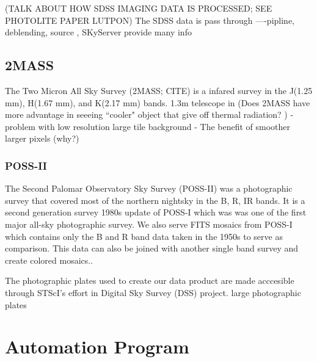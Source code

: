 \documentclass[5p]{elsarticle}
\begin{document}
(TALK ABOUT HOW SDSS IMAGING DATA IS PROCESSED; SEE PHOTOLITE PAPER LUTPON) 	 The SDSS data is pass through ----pipline, deblending, source , 
	SKyServer provide many info
	

	\subsection{2MASS}
	 The Two Micron All Sky Survey (2MASS; CITE) is a infared survey in the J(1.25 mm), H(1.67 mm), and K(2.17 mm) bands.
	 1.3m telescope in 
	 (Does 2MASS have more advantage in seeeing ``cooler" object that give off thermal radiation? )
	 - problem with low resolution large tile background
	 - The benefit of smoother larger pixels (why?)
	\subsubsection{POSS-II}
	The Second Palomar Observatory Sky Survey (POSS-II) was a photographic survey that covered most of the northern nightsky  in the B, R, IR bands.
	It is a second generation survey 	1980s update of POSS-I which was 	was one of the first major all-sky photographic survey. 	We also serve FITS mosaics from POSS-I which contains only the B and R band data taken in the 1950s to serve as comparison. This data can also be joined with another single band survey and create colored mosaics..


 The photographic plates used to create our data product are made acccesible through  STScI's effort in Digital Sky Survey (DSS) project.
	large photographic plates 
\section{Automation Program}
\end{document}
